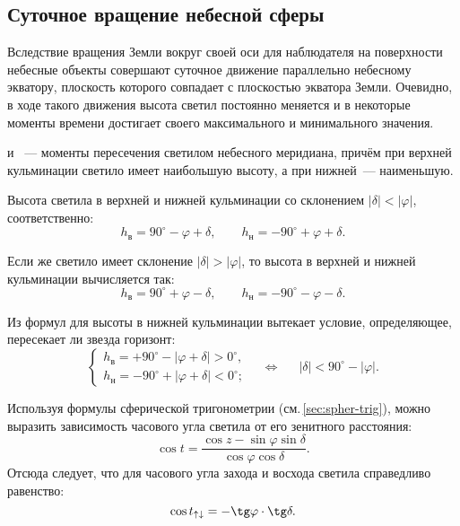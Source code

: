\subsection{Суточное вращение небесной сферы}
Вследствие вращения Земли вокруг своей оси для наблюдателя на поверхности небесные объекты совершают суточное движение параллельно небесному экватору, плоскость которого совпадает с плоскостью экватора Земли. Очевидно, в ходе такого движения высота светил постоянно меняется и в некоторые моменты времени достигает своего максимального и минимального значения. 

 и ~--- моменты пересечения светилом небесного меридиана, причём при верхней кульминации светило имеет наибольшую высоту, а при нижней~--- наименьшую.

Высота светила в верхней и нижней кульминации со склонением $|\delta| < |\varphi|$, соответственно:
\begin{equation}
h_{\text{в}}= 90^\circ - \varphi + \delta, \quad\quad
h_{\text{н}}= - 90^\circ + \varphi  + \delta.
\end{equation}

Если же светило имеет склонение $|\delta| > |\varphi|$, то высота в верхней и нижней кульминации вычисляется так:
\begin{equation}
h_{\text{в}}= 90^\circ + \varphi - \delta, \quad\quad
h_{\text{н}}= - 90^\circ -\varphi - \delta.
\end{equation}

Из формул для высоты в нижней кульминации вытекает условие, определяющее, пересекает ли звезда горизонт:
\begin{equation}
\begin{cases}
	h_\text{в}= +90^\circ - |\varphi + \delta| > 0^\circ,\\
	h_\text{н} = - 90^\circ + |\varphi + \delta| < 0^\circ;	
\end{cases}
\quad \Longleftrightarrow \quad~~ |\delta|< 90^{\circ} - |\varphi|.
\end{equation}

Используя формулы сферической тригонометрии (см.\,\ref{sec:spher-trig}), можно выразить зависимость часового угла светила от его зенитного расстояния:
\begin{equation}
\cos t=\frac{\cos z-\sin\varphi\sin\delta}{\cos\varphi\cos\delta}. 
\end{equation}
Отсюда следует, что для часового угла захода и восхода светила справедливо равенство:
\begin{equation}
	\cos t_{\uparrow\downarrow}=-\tg\varphi\cdot\tg\delta.
\end{equation} 

